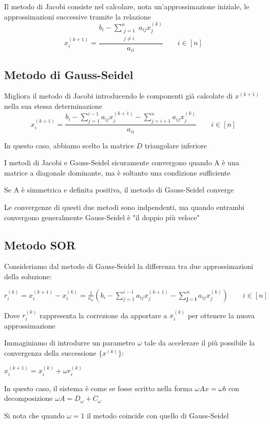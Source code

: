 \documentclass[openany]{book}
\begin{document}
Il metodo di Jacobi consiste nel calcolare, nota un'approssimazione iniziale, le approssimazioni successive tramite la relazione
\[ \displaystyle x_i^{(k+1)}=\frac{b_i-\displaystyle\sum^n_{\substack{j=1 \\ j\neq i}}a_{ij}x_j^{(k)}}{a_{ii}} \qquad i\in[n] \]
\subsection{Metodo di Gauss-Seidel}

Migliora il metodo di Jacobi introducendo le componenti già calcolate di $x^{(k+1)}$ nella sua stessa determinazione
\[ \displaystyle x_i^{(k+1)}=\frac{b_i-\displaystyle\sum_{j=1}^{i-1}a_{ij}x_j^{(k+1)}-\displaystyle\sum^n_{j=i+1}a_{ij}x_j^{(k)}}{a_{ii}} \qquad i\in[n] \]

In questo caso, abbiamo scelto la matrice $D$ triangolare inferiore

I metodi di Jacobi e Gauss-Seidel sicuramente convergono quando A è una matrice a diagonale dominante, ma è soltanto una condizione sufficiente

Se A è simmetrica e definita positiva, il metodo di Gauss-Seidel converge

Le convergenze di questi due metodi sono indpendenti, ma quando entrambi convergono generalmente Gauss-Seidel è "il doppio più veloce"
\subsection{Metodo SOR}

Consideriamo dal metodo di Gauss-Seidel la differenza tra due approssimazioni della soluzione: 

$r_i^{(k)}=x_i^{(k+1)}-x_i^{(k)}=\frac{1}{a_{ii}}\left( b_i-\sum_{j=1}^{i-1}a_{ij}x_j^{(k+1)} - \sum_{\boldsymbol{j=i}}^na_{ij}x_j^{(k)} \right) \qquad i\in[n]$

Dove $r_i^{(k)}$ rappresenta la correzione da apportare a $x_i^{(k)}$ per ottenere la nuova approssimazione

Immaginiamo di introdurre un parametro $\omega$ tale da accelerare il più possibile la convergenza della successione $\{x^{(k)}\}$:

$x_i^{(k+1)}=x_i^{(k)}+\omega r_i^{(k)}$

In questo caso, il sistema è come se fosse scritto nella forma $\omega Ax=\omega b$ con decomposizione $\omega A = D_\omega + C_\omega$

Si nota che quando $\omega=1$ il metodo coincide con quello di Gauss-Seidel
\end{document}
